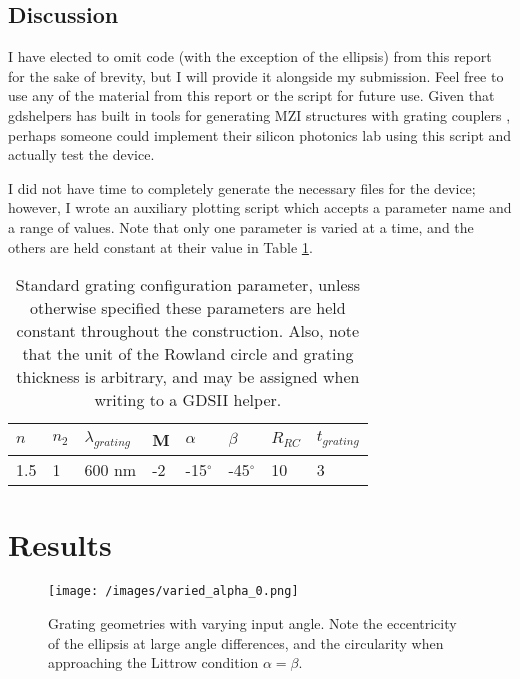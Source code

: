 \documentclass{article}
\begin{document}
    \subsection{Discussion}
    I have elected to omit code (with the exception of the ellipsis) from this report for the sake of brevity, but I will provide it alongside my submission. Feel free to use any of the material from this report or the script for future use. Given that gdshelpers has built in tools for generating MZI structures with grating couplers \cite{WelcomeDocumentation}, perhaps someone could implement their silicon photonics lab using this script and actually test the device. 
    
    I did not have time to completely generate the necessary files for the device; however, I wrote an auxiliary plotting script which accepts a parameter name and a range of values. Note that only one parameter is varied at a time, and the others are held constant at their value in Table \ref{tab:std_param}.
    
    \begin{table}[H]
    \centering
    \caption{Standard grating configuration parameter, unless otherwise specified these parameters are held constant throughout the construction. Also, note that the unit of the Rowland circle and grating thickness is arbitrary, and may be assigned when writing to a GDSII helper.}
    \label{tab:std_param}
    \begin{tabular}{|l|l|l|l|l|l|l|l|}
    \hline
    $n$ & $n_2$ & $\lambda_{grating}$ & M  & $\alpha$      & $\beta$       & $R_{RC}$ & $t_{grating}$ \\ \hline
    1.5 & 1     & 600 nm              & -2 & -15$^{\circ}$ & -45$^{\circ}$ & 10       & 3             \\ \hline
    \end{tabular}
    \end{table}
    
    
\section{Results}


    \begin{figure}[H]        
    \centering
    \scriptsize 
    \texttt{[image: /images/varied\_alpha\_0.png]}
    \caption{\label{fig:vary_alpha} Grating geometries with varying input angle. Note the eccentricity of the ellipsis at large angle differences, and the circularity when approaching the Littrow condition $\alpha = \beta$.}
    \end{figure}
    
\end{document}
